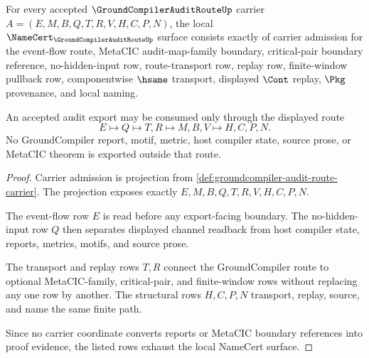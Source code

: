 \begin{theorem}
\label{thm:groundcompiler-audit-route-namecert-obligations}
For every accepted $\GroundCompilerAuditRouteUp$ carrier $A=(E,M,B,Q,T,R,V,H,C,P,N)$, the local $\NameCert_{\GroundCompilerAuditRouteUp}$ surface consists exactly of carrier admission for the event-flow route, MetaCIC audit-map-family boundary, critical-pair boundary reference, no-hidden-input row, route-transport row, replay row, finite-window pullback row, componentwise $\hsame$ transport, displayed $\Cont$ replay, $\Pkg$ provenance, and local naming.

An accepted audit export may be consumed only through the displayed route
$$
E \longmapsto Q \longmapsto T,R \longmapsto M,B,V \longmapsto H,C,P,N .
$$
No GroundCompiler report, motif, metric, host compiler state, source prose, or MetaCIC theorem is exported outside that route.
\end{theorem}
\begin{proof}
Carrier admission is projection from \autoref{def:groundcompiler-audit-route-carrier}. The projection exposes exactly $E,M,B,Q,T,R,V,H,C,P,N$.

The event-flow row $E$ is read before any export-facing boundary. The no-hidden-input row $Q$ then separates displayed channel readback from host compiler state, reports, metrics, motifs, and source prose.

The transport and replay rows $T,R$ connect the GroundCompiler route to optional MetaCIC-family, critical-pair, and finite-window rows without replacing any one row by another. The structural rows $H,C,P,N$ transport, replay, source, and name the same finite path.

Since no carrier coordinate converts reports or MetaCIC boundary references into proof evidence, the listed rows exhaust the local NameCert surface.
\end{proof}

